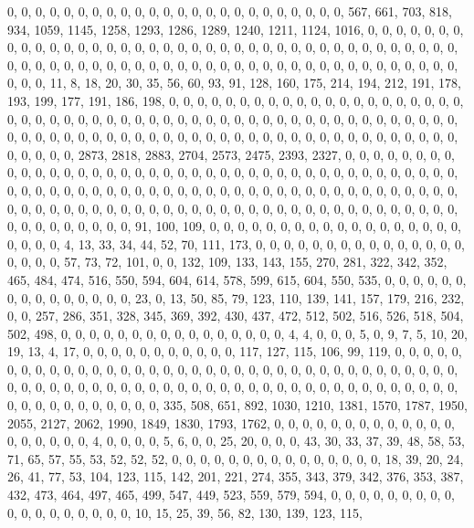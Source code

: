 \documentclass[
]{article}
\begin{document}
0, 0, 0, 0, 0, 0, 0, 0, 0, 0, 0, 0, 0, 0, 0, 0, 0, 0, 0, 0, 0, 0, 0, 0,
567, 661, 703, 818, 934, 1059, 1145, 1258, 1293, 1286, 1289, 1240, 1211,
1124, 1016, 0, 0, 0, 0, 0, 0, 0, 0, 0, 0, 0, 0, 0, 0, 0, 0, 0, 0, 0, 0,
0, 0, 0, 0, 0, 0, 0, 0, 0, 0, 0, 0, 0, 0, 0, 0, 0, 0, 0, 0, 0, 0, 0, 0,
0, 0, 0, 0, 0, 0, 0, 0, 0, 0, 0, 0, 0, 0, 0, 0, 0, 0, 0, 0, 0, 0, 0, 0,
0, 0, 0, 0, 0, 0, 11, 8, 18, 20, 30, 35, 56, 60, 93, 91, 128, 160, 175,
214, 194, 212, 191, 178, 193, 199, 177, 191, 186, 198, 0, 0, 0, 0, 0, 0,
0, 0, 0, 0, 0, 0, 0, 0, 0, 0, 0, 0, 0, 0, 0, 0, 0, 0, 0, 0, 0, 0, 0, 0,
0, 0, 0, 0, 0, 0, 0, 0, 0, 0, 0, 0, 0, 0, 0, 0, 0, 0, 0, 0, 0, 0, 0, 0,
0, 0, 0, 0, 0, 0, 0, 0, 0, 0, 0, 0, 0, 0, 0, 0, 0, 0, 0, 0, 0, 0, 0, 0,
0, 0, 0, 0, 0, 0, 0, 0, 0, 0, 0, 0, 2873, 2818, 2883, 2704, 2573, 2475,
2393, 2327, 0, 0, 0, 0, 0, 0, 0, 0, 0, 0, 0, 0, 0, 0, 0, 0, 0, 0, 0, 0,
0, 0, 0, 0, 0, 0, 0, 0, 0, 0, 0, 0, 0, 0, 0, 0, 0, 0, 0, 0, 0, 0, 0, 0,
0, 0, 0, 0, 0, 0, 0, 0, 0, 0, 0, 0, 0, 0, 0, 0, 0, 0, 0, 0, 0, 0, 0, 0,
0, 0, 0, 0, 0, 0, 0, 0, 0, 0, 0, 0, 0, 0, 0, 0, 0, 0, 0, 0, 0, 0, 0, 0,
0, 0, 0, 0, 0, 0, 0, 0, 0, 0, 0, 0, 0, 0, 0, 0, 0, 0, 0, 0, 0, 91, 100,
109, 0, 0, 0, 0, 0, 0, 0, 0, 0, 0, 0, 0, 0, 0, 0, 0, 0, 0, 0, 0, 0, 0,
4, 13, 33, 34, 44, 52, 70, 111, 173, 0, 0, 0, 0, 0, 0, 0, 0, 0, 0, 0, 0,
0, 0, 0, 0, 0, 0, 0, 57, 73, 72, 101, 0, 0, 132, 109, 133, 143, 155,
270, 281, 322, 342, 352, 465, 484, 474, 516, 550, 594, 604, 614, 578,
599, 615, 604, 550, 535, 0, 0, 0, 0, 0, 0, 0, 0, 0, 0, 0, 0, 0, 0, 0,
23, 0, 13, 50, 85, 79, 123, 110, 139, 141, 157, 179, 216, 232, 0, 0,
257, 286, 351, 328, 345, 369, 392, 430, 437, 472, 512, 502, 516, 526,
518, 504, 502, 498, 0, 0, 0, 0, 0, 0, 0, 0, 0, 0, 0, 0, 0, 0, 0, 0, 4,
4, 0, 0, 0, 5, 0, 9, 7, 5, 10, 20, 19, 13, 4, 17, 0, 0, 0, 0, 0, 0, 0,
0, 0, 0, 0, 117, 127, 115, 106, 99, 119, 0, 0, 0, 0, 0, 0, 0, 0, 0, 0,
0, 0, 0, 0, 0, 0, 0, 0, 0, 0, 0, 0, 0, 0, 0, 0, 0, 0, 0, 0, 0, 0, 0, 0,
0, 0, 0, 0, 0, 0, 0, 0, 0, 0, 0, 0, 0, 0, 0, 0, 0, 0, 0, 0, 0, 0, 0, 0,
0, 0, 0, 0, 0, 0, 0, 0, 0, 0, 0, 0, 0, 0, 0, 0, 0, 0, 0, 0, 0, 0, 335,
508, 651, 892, 1030, 1210, 1381, 1570, 1787, 1950, 2055, 2127, 2062,
1990, 1849, 1830, 1793, 1762, 0, 0, 0, 0, 0, 0, 0, 0, 0, 0, 0, 0, 0, 0,
0, 0, 0, 0, 0, 4, 0, 0, 0, 0, 5, 6, 0, 0, 25, 20, 0, 0, 0, 43, 30, 33,
37, 39, 48, 58, 53, 71, 65, 57, 55, 53, 52, 52, 52, 0, 0, 0, 0, 0, 0, 0,
0, 0, 0, 0, 0, 0, 0, 0, 18, 39, 20, 24, 26, 41, 77, 53, 104, 123, 115,
142, 201, 221, 274, 355, 343, 379, 342, 376, 353, 387, 432, 473, 464,
497, 465, 499, 547, 449, 523, 559, 579, 594, 0, 0, 0, 0, 0, 0, 0, 0, 0,
0, 0, 0, 0, 0, 0, 0, 0, 0, 10, 15, 25, 39, 56, 82, 130, 139, 123, 115,
\end{document}
